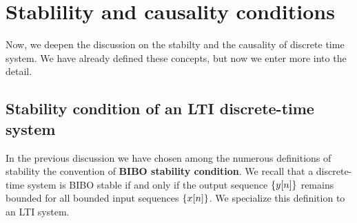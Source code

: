 \documentclass[../../main/main.tex]{subfiles}
\begin{document}

\section{Stablility and causality conditions}
Now, we deepen the discussion on the stabilty and the causality of discrete time system. We have already defined these concepts, but now we enter more into the detail.



\subsection{Stability condition of an LTI discrete-time system}
In the previous discussion we have chosen among the numerous definitions of stability the convention of \textbf{BIBO stability condition}. We recall that a discrete-time system is BIBO stable if and only if the output sequence \( \qty{y[n]} \) remains bounded for all bounded input sequences \( \qty{x[n]} \). We specialize this definition to an LTI system.
\end{document}
